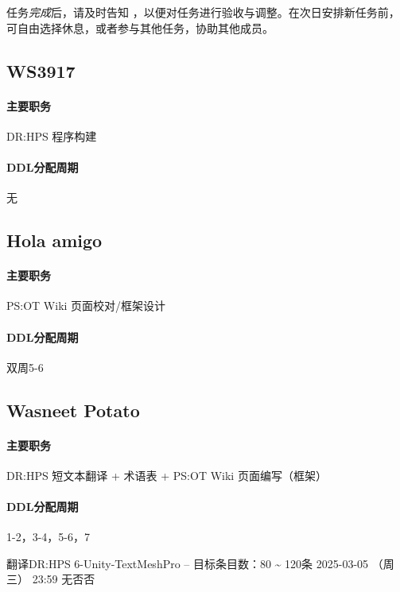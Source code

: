 \documentclass[UTF8, a4paper, 12pt]{ctexart}
\begin{document}
任务\emph{完成}后，请及时告知 ，以便对任务进行验收与调整。在次日安排新任务前，可自由选择休息，或者参与其他任务，协助其他成员。

\paragraph{}

\subsection{WS3917}\label{ws3917}
\paragraph{主要职务} DR:HPS 程序构建
\paragraph{DDL分配周期} 无
\newpage
\subsection{Hola amigo}\label{hola}
\paragraph{主要职务} PS:OT Wiki 页面校对/框架设计
\paragraph{DDL分配周期} 双周5-6
\newpage

\subsection{Wasneet Potato}\label{wasneet}
\paragraph{主要职务} DR:HPS 短文本翻译 + 术语表 + PS:OT Wiki 页面编写（框架）
\paragraph{DDL分配周期} 1-2，3-4，5-6，7


{翻译DR:HPS 6-Unity-TextMeshPro  -- 目标条目数：80 \~{} 120条}
{2025-03-05 （周三） 23:59}
{无}{否}{否}
\end{document}
